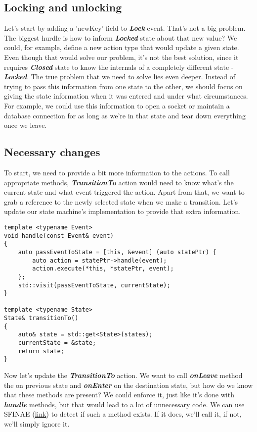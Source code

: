\documentclass{article}[8pt]
\newcommand{\code}[1]{\textbf{\textit{#1}}}
\newcommand{\closed}{\code{Closed}}
\newcommand{\locked}{\code{Locked}}
\newcommand{\lock}{\code{Lock}}
\begin{document}
\subsection*{Locking and unlocking}
Let's start by adding a 'newKey' field to \lock{} event. That's not a big problem. The biggest hurdle is how to inform \locked{} state about that new value? We could, for example, define a new action type that would update a given state. Even though that would solve our problem, it's not the best solution, since it requires \closed{} state to know the internals of a completely different state - \locked{}. The true problem that we need to solve lies even deeper. Instead of trying to pass this information from one state to the other, we should focus on giving the state information when it was entered and under what circumstances. For example, we could use this information to open a socket or maintain a database connection for as long as we're in that state and tear down everything once we leave.

\subsection*{Necessary changes}
To start, we need to provide a bit more information to the actions. To call appropriate methods, \code{TransitionTo} action would need to know what's the current state and what event triggered the action. Apart from that, we want to grab a reference to the newly selected state when we make a transition. Let's update our state machine's implementation to provide that extra information.

\bigskip
\begin{verbatim}
template <typename Event>
void handle(const Event& event)
{
    auto passEventToState = [this, &event] (auto statePtr) {
        auto action = statePtr->handle(event);
        action.execute(*this, *statePtr, event);
    };
    std::visit(passEventToState, currentState);
}

template <typename State>
State& transitionTo()
{
    auto& state = std::get<State>(states);
    currentState = &state;
    return state;
}
\end{verbatim}
\bigskip

Now let's update the \code{TransitionTo} action. We want to call \code{onLeave} method the on previous state and \code{onEnter} on the destination state, but how do we know that these methods are present? We could enforce it, just like it's done with \code{handle} methods, but that would lead to a lot of unnecessary code. We can use SFINAE (\href{https://en.cppreference.com/w/cpp/language/sfinae}{link}) to detect if such a method exists. If it does, we'll call it, if not, we'll simply ignore it.
\end{document}
